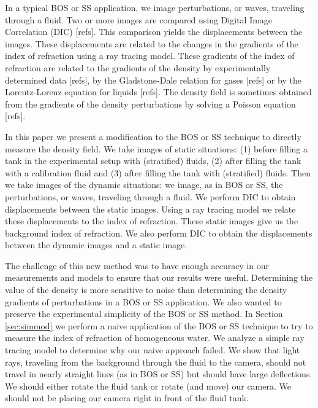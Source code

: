 \documentclass[smallextended]{svjour3}       %
\begin{document}
In a typical BOS or SS application, we image perturbations, or waves, traveling through a fluid. Two or more images are compared using Digital Image Correlation (DIC) [refs]. This comparison yields the displacements between the images. These displacements are related to the changes in the gradients of the index of refraction using a ray tracing model. These gradients of the index of refraction are related to the gradients of the density by experimentally determined data [refs], by the Gladstone-Dale relation for gases [refs] or by the Lorentz-Lorenz equation for liquids [refs]. The density field is sometimes obtained from the gradients of the density perturbations by solving a Poisson equation [refs].

In this paper we present a modification to the BOS or SS technique to directly measure the density field. We take images of static situations:  (1) before filling a tank in the experimental setup with (stratified) fluids, (2) after filling the tank with a calibration fluid and (3) after filling the tank with (stratified) fluids. Then we take images of the dynamic situations: we image, as in BOS or SS, the perturbations, or waves, traveling through a fluid. We perform DIC to obtain displacements between the static images. Using a ray tracing model we relate these displacements to the index of refraction. These static images give us the background index of refraction. We also perform DIC to obtain the displacements between the dynamic images and a static image.

The challenge of this new method was to have enough accuracy in our measurements and models to ensure that our results were useful. Determining the value of the density is more sensitive to noise than determining the density gradients of perturbations in a BOS or SS application. We also wanted to preserve the experimental simplicity of the BOS or SS method. In Section \ref{sec:simmod} we perform a naive application of the BOS or SS technique to try to measure the index of refraction of homogeneous water. We analyze a simple ray tracing model to determine why our naive approach failed. We show that light rays, traveling from the background through the fluid to the camera, should not travel in nearly straight lines (as in BOS or SS) but should have large deflections. We should either rotate the fluid tank or rotate (and move) our camera. We should not be placing our camera right in front of the fluid tank. 
\end{document}
